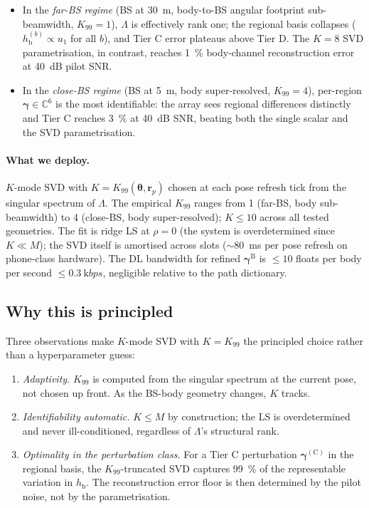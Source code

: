\documentclass[11pt,a4paper]{article}
\theoremstyle{definition}
\newcommand{\rr}{\mathbf{r}}
\newcommand{\Complex}{\mathbb{C}}
\newcommand{\thetab}{\bm{\theta}}
\newcommand{\hbody}{h_{\mathrm{b}}}
\begin{document}
\begin{itemize}[leftmargin=1.6em,itemsep=2pt]
\item In the \emph{far-BS regime} (BS at \SI{30}{\m},
body-to-BS angular footprint sub-beamwidth, $K_{99}\!=\!1$),
$\Lambda$ is effectively rank one; the regional basis collapses
($\hbody^{(b)}\propto u_1$ for all $b$), and Tier C error plateaus
above Tier D.  The $K\!=\!8$ SVD parametrisation, in contrast,
reaches \SI{1}{\percent} body-channel reconstruction error at
\SI{40}{\dB} pilot SNR.
\item In the \emph{close-BS regime} (BS at \SI{5}{\m}, body
super-resolved, $K_{99}\!=\!4$), per-region $\bm\gamma\in\Complex^6$
is the most identifiable: the array sees regional differences
distinctly and Tier C reaches \SI{3}{\percent} at \SI{40}{\dB} SNR,
beating both the single scalar and the SVD parametrisation.
\end{itemize}

\paragraph{What we deploy.}  $K$-mode SVD with
$K=K_{99}(\thetab,\rr_p)$ chosen at each pose refresh tick from
the singular spectrum of $\Lambda$.  The empirical $K_{99}$ ranges
from 1 (far-BS, body sub-beamwidth) to 4 (close-BS, body
super-resolved); $K\le 10$ across all tested geometries.  The fit
is ridge LS at $\rho=0$ (the system is overdetermined since
$K\ll M$); the SVD itself is amortised across slots
($\sim$\SI{80}{\milli\second} per pose refresh on phone-class
hardware).  The DL bandwidth for refined $\bm\gamma^{\mathrm{B}}$
is $\le 10$ floats per body per second
$\le\SI{0.3}{\kilo bps}$, negligible relative to the path
dictionary.

\subsection{Why this is principled}

Three observations make $K$-mode SVD with
$K\!=\!K_{99}$ the principled choice rather than a hyperparameter
guess:
\begin{enumerate}[leftmargin=1.6em,itemsep=2pt]
\item \emph{Adaptivity.}  $K_{99}$ is computed from the singular
spectrum at the current pose, not chosen up front.  As the BS-body
geometry changes, $K$ tracks.
\item \emph{Identifiability automatic.}  $K\le M$ by construction;
the LS is overdetermined and never ill-conditioned, regardless of
$\Lambda$'s structural rank.
\item \emph{Optimality in the perturbation class.}  For a Tier C
perturbation $\bm\gamma^{(\mathrm{C})}$ in the regional basis, the
$K_{99}$-truncated SVD captures \SI{99}{\percent} of the
representable variation in $\hbody$.  The reconstruction error
floor is then determined by the pilot noise, not by the
parametrisation.
\end{enumerate}
\end{document}
